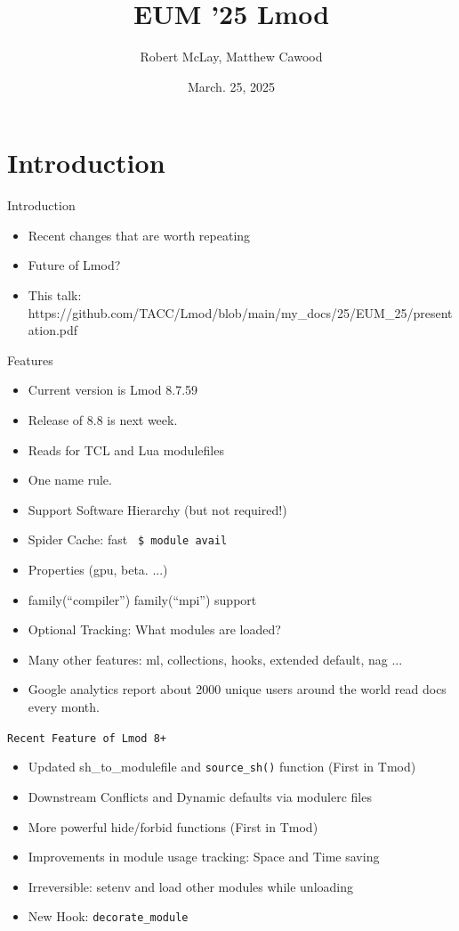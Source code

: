 \documentclass{beamer}
\begin{document}
\title[Lmod]{EUM '25 Lmod}
\author{Robert McLay, Matthew Cawood} 
\date{March. 25, 2025}

\frame{\titlepage} 

\section{Introduction}

\begin{frame}{Introduction}
  \begin{itemize}
    \item Recent changes that are worth repeating
    \item Future of Lmod?
    \item This talk: https://github.com/TACC/Lmod/blob/main/my\_docs/25/EUM\_25/presentation.pdf
  \end{itemize}
\end{frame}

\begin{frame}{Features}
  \begin{itemize}
    \item Current version is Lmod 8.7.59
    \item Release of 8.8 is next week.
    \item Reads for TCL and Lua modulefiles
    \item One name rule.
    \item Support Software Hierarchy (but not required!)
    \item Spider Cache: fast \texttt{\color{blue} \$ module avail}
    \item Properties (gpu, beta. ...)
    \item family(``compiler'') family(``mpi'') support
    \item Optional Tracking: What modules are loaded?
    \item Many other features: ml, collections, hooks,
      extended default, nag ...
    \item Google analytics report about 2000 unique users around the
      world read docs every month.
  \end{itemize}
\end{frame}

\begin{frame}{\texttt{Recent Feature of Lmod 8+}}
  \begin{itemize}
    \item Updated sh\_to\_modulefile and \texttt{source\_sh()} function (First
      in Tmod)
    \item Downstream Conflicts and Dynamic defaults via modulerc files
    \item More powerful hide/forbid functions (First in Tmod)
    \item Improvements in module usage tracking: Space and Time saving
    \item Irreversible: setenv and load other modules while unloading
    \item New Hook: \texttt{decorate\_module}
  \end{itemize}
\end{frame}
\end{document}
